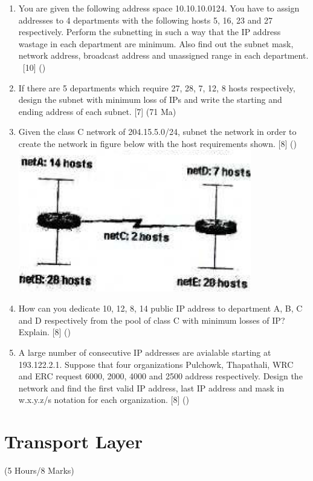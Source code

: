 \documentclass[12pt]{article}
\newcommand{\enter}{\\\textcolor{white}{1}}
\begin{document}
\begin{enumerate}
			\item You are given the following address space 10.10.10.0124. You have to assign addresses to 4 departments with the following hosts 5, 16, 23 and 27 respectively. Perform the subnetting in such a way that the IP address wastage in each department are minimum. Also find out the subnet mask, network address, broadcast address and unassigned range in each department.
			\enter\hfill [10] ()

			\item If there are 5 departments which require 27, 28, 7, 12, 8 hosts respectively, design the subnet with minimum loss of IPs and write the starting and ending address of each subnet. \hfill [7] (71 Ma)

			\item Given the class C network of 204.15.5.0/24, subnet the network in order to create the network in figure below with the host requirements shown. \hfill [8] ()\\
			\includegraphics[width=4in]{cn_1}

			\item How can you dedicate 10, 12, 8, 14 public IP address to department A, B, C and D respectively from the pool of class C with minimum losses of IP? Explain. \hfill [8] ()

			\item A large number of consecutive IP addresses are avialable starting at 193.122.2.1. Suppose that four organizations Pulchowk, Thapathali, WRC and ERC request 6000, 2000, 4000 and 2500 address respectively. Design the network and find the first valid IP address, last IP address and mask in w.x.y.z/s notation for each organization. \hfill [8] ()
		\end{enumerate}

	\pagebreak
\section{Transport Layer}
	\begin{center}(5 Hours/8 Marks)\end{center}
\end{document}
